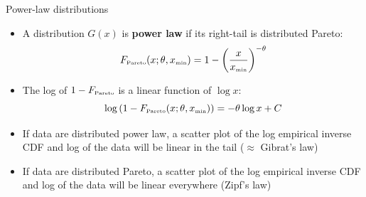 \documentclass[notes=show]{beamer}
\begin{document}
\begin{frame}{Power-law distributions}

    \begin{itemize} 
        \item A distribution $G(x)$ is \textbf{power law} if its right-tail is distributed Pareto:
            \begin{equation}
                F_{\mbox{{\tiny{Pareto}}}}(x;\theta,x_{\tiny\mbox{min}}) = 1 - \left(\frac{x}{x_{\tiny\mbox{min}}}\right)^{-\theta} \nonumber
            \end{equation}
        \item The log of $1 - F_{\mbox{{\tiny{Pareto}}}}$ is a linear function of $\log{x}$:
            \begin{equation}
                \log\left({1 - F_{\mbox{\tiny{Pareto}}}(x;\theta,x_{\tiny\mbox{min}})}\right) = -\theta \log{x} + C\nonumber
            \end{equation}
        \item If data are distributed power law, a scatter plot of the log empirical inverse CDF and log of the data will be linear in the tail ($\approx$ Gibrat's law)
        \item If data are distributed Pareto, a scatter plot of the log empirical inverse CDF and log of the data will be linear everywhere (Zipf's law)
    \end{itemize}

\end{frame}
\end{document}
